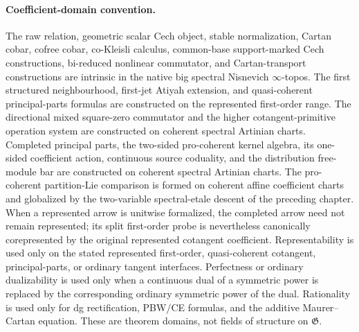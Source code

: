 \paragraph{Coefficient-domain convention.}
The raw relation, geometric scalar Cech object, stable normalization, Cartan
cobar, cofree cobar, co-Kleisli calculus, common-base support-marked Cech
constructions, bi-reduced nonlinear commutator, and Cartan-transport
constructions are intrinsic in the native big spectral Nisnevich
$\infty$-topos.  The first structured neighbourhood, first-jet Atiyah
extension, and quasi-coherent principal-parts formulas are constructed on the
represented first-order range.  The directional mixed square-zero commutator
and the higher cotangent-primitive operation system are constructed on
coherent spectral Artinian charts.  Completed principal parts, the two-sided
pro-coherent kernel algebra, its one-sided coefficient action, continuous
source coduality, and the distribution free-module bar are constructed on
coherent spectral Artinian charts.  The pro-coherent partition-Lie comparison
is formed on coherent affine coefficient charts and globalized by the
two-variable spectral-etale descent of the preceding chapter.  When a
represented arrow is unitwise formalized, the completed arrow need not remain
represented; its split first-order probe is nevertheless canonically
corepresented by the original represented cotangent coefficient.
Representability is used only on the stated represented first-order,
quasi-coherent cotangent, principal-parts, or ordinary tangent interfaces.
Perfectness or ordinary dualizability is used only when a continuous dual of
a symmetric power is replaced by the corresponding ordinary symmetric power
of the dual.  Rationality is used only for dg rectification, PBW/CE formulas,
and the additive Maurer--Cartan equation.  These are theorem domains, not
fields of structure on $\mathfrak G$.

